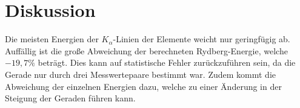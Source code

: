 \section{Diskussion}
\label{sec:Diskussion}
Die meisten Energien der $K_{\alpha}$-Linien der Elemente weicht nur geringfügig ab.
Auffällig ist die große Abweichung der berechneten Rydberg-Energie, welche $-19,7\%$ beträgt. Dies kann auf statistische
Fehler zurückzuführen sein, da die Gerade nur durch drei Messwertepaare bestimmt war. Zudem kommt die Abweichung der einzelnen
Energien dazu, welche zu einer Änderung in der Steigung der Geraden führen kann.
